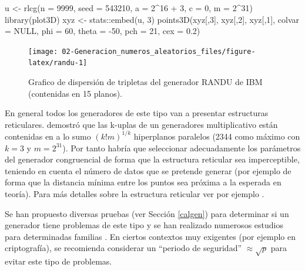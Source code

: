 \documentclass[
  10pt,
]{book}
\newenvironment{Shaded}{\begin{snugshade}}{\end{snugshade}}
\newcommand{\AttributeTok}[1]{\textcolor[rgb]{0.77,0.63,0.00}{#1}}
\newcommand{\ConstantTok}[1]{\textcolor[rgb]{0.00,0.00,0.00}{#1}}
\newcommand{\DecValTok}[1]{\textcolor[rgb]{0.00,0.00,0.81}{#1}}
\newcommand{\FloatTok}[1]{\textcolor[rgb]{0.00,0.00,0.81}{#1}}
\newcommand{\FunctionTok}[1]{\textcolor[rgb]{0.00,0.00,0.00}{#1}}
\newcommand{\NormalTok}[1]{#1}
\newcommand{\OtherTok}[1]{\textcolor[rgb]{0.56,0.35,0.01}{#1}}
\newcommand{\SpecialCharTok}[1]{\textcolor[rgb]{0.00,0.00,0.00}{#1}}
\theoremstyle{break}
\theoremstyle{nonumberplain}
\begin{document}
\begin{Shaded}
\begin{Highlighting}[]
\NormalTok{u }\OtherTok{\textless{}{-}} \FunctionTok{rlcg}\NormalTok{(}\AttributeTok{n =} \DecValTok{9999}\NormalTok{, }\AttributeTok{seed =} \DecValTok{543210}\NormalTok{, }\AttributeTok{a =} \DecValTok{2}\SpecialCharTok{\^{}}\DecValTok{16} \SpecialCharTok{+} \DecValTok{3}\NormalTok{, }\AttributeTok{c =} \DecValTok{0}\NormalTok{, }\AttributeTok{m =} \DecValTok{2}\SpecialCharTok{\^{}}\DecValTok{31}\NormalTok{)}
\FunctionTok{library}\NormalTok{(plot3D)}
\NormalTok{xyz }\OtherTok{\textless{}{-}}\NormalTok{ stats}\SpecialCharTok{::}\FunctionTok{embed}\NormalTok{(u, }\DecValTok{3}\NormalTok{)}
\FunctionTok{points3D}\NormalTok{(xyz[,}\DecValTok{3}\NormalTok{], xyz[,}\DecValTok{2}\NormalTok{], xyz[,}\DecValTok{1}\NormalTok{], }\AttributeTok{colvar =} \ConstantTok{NULL}\NormalTok{, }\AttributeTok{phi =} \DecValTok{60}\NormalTok{, }
         \AttributeTok{theta =} \SpecialCharTok{{-}}\DecValTok{50}\NormalTok{, }\AttributeTok{pch =} \DecValTok{21}\NormalTok{, }\AttributeTok{cex =} \FloatTok{0.2}\NormalTok{)}
\end{Highlighting}
\end{Shaded}

\begin{figure}[!htbp]

{\centering \texttt{[image: 02-Generacion\_numeros\_aleatorios\_files/figure-latex/randu-1]} 

}

\caption{Grafico de dispersión de tripletas del generador RANDU de IBM (contenidas en 15 planos).}\label{fig:randu}
\end{figure}

En general todos los generadores de este tipo van a presentar estructuras reticulares.
\citet{marsaglia1968} demostró que las k-uplas de un generadores multiplicativo están contenidas en a lo sumo \(\left(k!m\right)^{1/k}\) hiperplanos paralelos (2344 como máximo con \(k=3\) y \(m=2^{31}\)).
Por tanto habría que seleccionar adecuadamente los parámetros del generador congruencial de forma que la estructura reticular sea imperceptible, teniendo en cuenta el número de datos que se pretende generar (por ejemplo de forma que la distancia mínima entre los puntos sea próxima a la esperada en teoría).
Para más detalles sobre la estructura reticular ver por ejemplo \citet[Sección 2.7]{ripley1987stochastic}.

Se han propuesto diversas pruebas (ver Sección \ref{calgen}) para determinar si un generador tiene problemas de este tipo y se han realizado numerosos estudios para determinadas familias \citep[e.g.][estudiaron los multiplicadores adecuados para \(m=2^{31}-1\), analizando el comportamiento de sus raíces primitivas.]{park1988}.
En ciertos contextos muy exigentes (por ejemplo en criptografía), se recomienda considerar un ``periodo de seguridad'' \(\approx \sqrt{p}\) para evitar este tipo de problemas.
\end{document}
